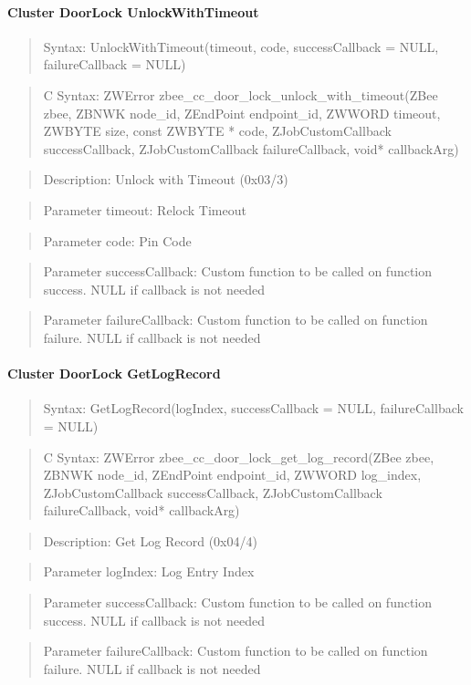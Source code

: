 \paragraph{Cluster DoorLock UnlockWithTimeout}
\begin{quote}Syntax: UnlockWithTimeout(timeout, code, successCallback = NULL, failureCallback = NULL)\end{quote}
\begin{quote}C Syntax: ZWError zbee\_cc\_door\_lock\_unlock\_with\_timeout(ZBee zbee, ZBNWK node\_id, ZEndPoint endpoint\_id, ZWWORD timeout, ZWBYTE size, const ZWBYTE * code, ZJobCustomCallback successCallback, ZJobCustomCallback failureCallback, void* callbackArg)\end{quote}
\begin{quote}Description: Unlock with Timeout (0x03/3)\end{quote}
\begin{quote}Parameter timeout: Relock Timeout\end{quote}
\begin{quote}Parameter code: Pin Code\end{quote}
\begin{quote}Parameter successCallback: Custom function to be called on function success. NULL if callback is not needed\end{quote}
\begin{quote}Parameter failureCallback: Custom function to be called on function failure. NULL if callback is not needed\end{quote}


\paragraph{Cluster DoorLock GetLogRecord}
\begin{quote}Syntax: GetLogRecord(logIndex, successCallback = NULL, failureCallback = NULL)\end{quote}
\begin{quote}C Syntax: ZWError zbee\_cc\_door\_lock\_get\_log\_record(ZBee zbee, ZBNWK node\_id, ZEndPoint endpoint\_id, ZWWORD log\_index, ZJobCustomCallback successCallback, ZJobCustomCallback failureCallback, void* callbackArg)\end{quote}
\begin{quote}Description: Get Log Record (0x04/4)\end{quote}
\begin{quote}Parameter logIndex: Log Entry Index\end{quote}
\begin{quote}Parameter successCallback: Custom function to be called on function success. NULL if callback is not needed\end{quote}
\begin{quote}Parameter failureCallback: Custom function to be called on function failure. NULL if callback is not needed\end{quote}


